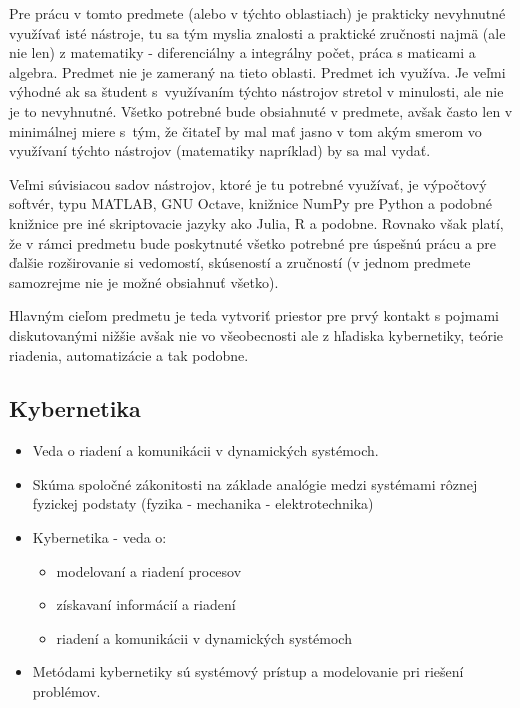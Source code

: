 \documentclass[a4paper, 10pt, ]{article}
\begin{document}
Pre prácu v tomto predmete (alebo v týchto oblastiach) je prakticky nevyhnutné využívať isté nástroje, tu sa tým myslia znalosti a praktické zručnosti najmä (ale nie len) z matematiky - diferenciálny a integrálny počet, práca s maticami a algebra. Predmet nie je zameraný na tieto oblasti. Predmet ich využíva. Je veľmi výhodné ak sa študent s~využívaním týchto nástrojov stretol v minulosti, ale nie je to nevyhnutné. Všetko potrebné bude obsiahnuté v predmete, avšak často len v minimálnej miere s~tým, že čitateľ by mal mať jasno v tom akým smerom vo využívaní týchto nástrojov (matematiky napríklad) by sa mal vydať.

Veľmi súvisiacou sadov nástrojov, ktoré je tu potrebné využívať, je výpočtový softvér, typu MATLAB, GNU Octave, knižnice NumPy pre Python a podobné knižnice pre iné skriptovacie jazyky ako Julia, R a podobne. Rovnako však platí, že v rámci predmetu bude poskytnuté všetko potrebné pre úspešnú prácu a pre ďalšie rozširovanie si vedomostí, skúseností a zručností (v jednom predmete samozrejme nie je možné obsiahnuť všetko).

Hlavným cieľom predmetu je teda vytvoriť priestor pre prvý kontakt s pojmami diskutovanými nižšie avšak nie vo všeobecnosti ale z hľadiska kybernetiky, teórie riadenia, automatizácie a tak podobne.





\subsection{Kybernetika}

\begin{itemize}[leftmargin=0pt, labelsep=3mm, itemsep=0pt]
    \item Veda o riadení a komunikácii v dynamických systémoch.
    \item Skúma spoločné zákonitosti na základe analógie medzi systémami rôznej fyzickej podstaty (fyzika - mechanika - elektrotechnika)
    \item Kybernetika - veda o:
    \begin{itemize}
        \item modelovaní a riadení procesov
        \item získavaní informácií a riadení
        \item riadení a komunikácii v dynamických systémoch
    \end{itemize}
    \item Metódami kybernetiky sú systémový prístup a modelovanie pri riešení problémov.
\end{itemize}
\end{document}
